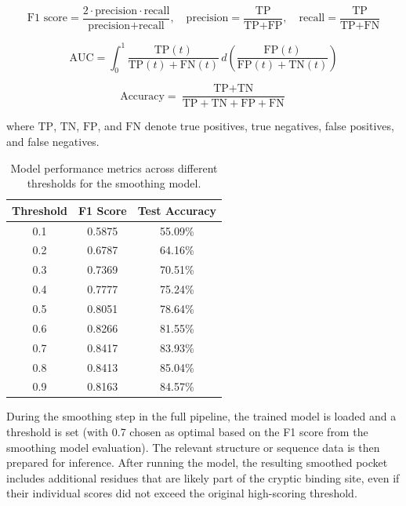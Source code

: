 \begin{equation}
\text{F1 score} = \frac{2 \cdot \text{precision} \cdot \text{recall}}{\text{precision} + \text{recall}}, \quad
\text{precision} = \frac{\text{TP}}{\text{TP} + \text{FP}}, \quad
\text{recall} = \frac{\text{TP}}{\text{TP} + \text{FN}}
\label{eq:f1-score}
\end{equation}

\begin{equation}
\text{AUC} = \int_0^1 \frac{\text{TP}(t)}{\text{TP}(t) + \text{FN}(t)} \, d\left( \frac{\text{FP}(t)}{\text{FP}(t) + \text{TN}(t)} \right)
\label{eq:auc}
\end{equation}

\begin{equation}
\text{Accuracy} = \frac{\text{TP} + \text{TN}}{\text{TP} + \text{TN} + \text{FP} + \text{FN}}
\label{eq:accuracy}
\end{equation}

where $\text{TP}$, $\text{TN}$, $\text{FP}$, and $\text{FN}$ denote true positives, true negatives, false positives, and false negatives.

\begin{table}[htbp]
    \centering
    \caption{Model performance metrics across different thresholds for the smoothing model.}
    \label{tab:smoothing-thresholds}
    \begin{tabular}{c|c|c}
        \hline
        \textbf{Threshold} & \textbf{F1 Score} & \textbf{Test Accuracy} \\
        \hline
        0.1 & 0.5875 & 55.09\% \\
        0.2 & 0.6787 & 64.16\% \\
        0.3 & 0.7369 & 70.51\% \\
        0.4 & 0.7777 & 75.24\% \\
        0.5 & 0.8051 & 78.64\% \\
        0.6 & 0.8266 & 81.55\% \\
        0.7 & 0.8417 & 83.93\% \\
        0.8 & 0.8413 & 85.04\% \\
        0.9 & 0.8163 & 84.57\% \\
        \hline
    \end{tabular}
\end{table}


During the smoothing step in the full pipeline, the trained model is loaded and a threshold is set (with 0.7 chosen as optimal based on the F1 score from the smoothing model evaluation). The relevant structure or sequence data is then prepared for inference. After running the model, the resulting smoothed pocket includes additional residues that are likely part of the cryptic binding site, even if their individual scores did not exceed the original high-scoring threshold.

